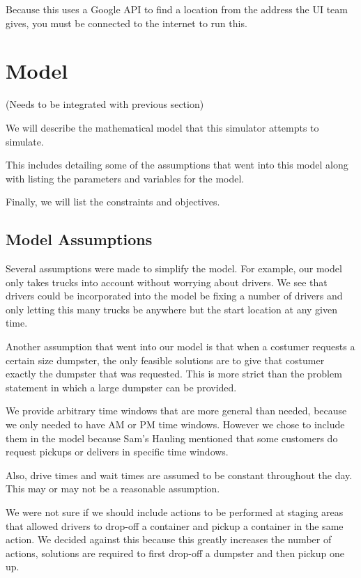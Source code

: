 \documentclass{article}
\begin{document}
Because this uses a Google API to find a location from the address the UI team gives, you must be connected to the internet to run this.

\section{Model}

(Needs to be integrated with previous section)


We will describe the mathematical model that this simulator attempts to simulate.

This includes detailing some of the assumptions that went into this model along with listing the parameters and variables for the model.

Finally, we will list the constraints and objectives.

\subsection{Model Assumptions}

Several assumptions were made to simplify the model.
For example, our model only takes trucks into account without worrying about drivers.
We see that drivers could be incorporated into the model be fixing a number of drivers and only letting this many trucks be anywhere but the start location at any given time.

Another assumption that went into our model is that when a costumer requests a certain size dumpster, the only feasible solutions are to give that costumer exactly the dumpster that was requested.
This is more strict than the problem statement in which a large dumpster can be provided.

We provide arbitrary time windows that are more general than needed, because we only needed to have AM or PM time windows.
However we chose to include them in the model because Sam's Hauling mentioned that some customers do request pickups or delivers in specific time windows.

Also, drive times and wait times are assumed to be constant throughout the day.
This may or may not be a reasonable assumption.

We were not sure if we should include actions to be performed at staging areas that allowed drivers to drop-off a container and pickup a container in the same action.
We decided against this because this greatly increases the number of actions, solutions are required to first drop-off a dumpster and then pickup one up.
\end{document}
